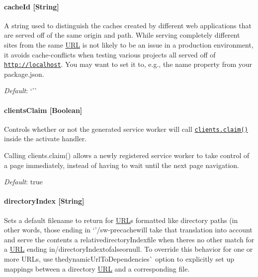 \paragraph*{cache\+Id \mbox{[}String\mbox{]}}

A string used to distinguish the caches created by different web applications that are served off of the same origin and path. While serving completely different sites from the same \mbox{\hyperlink{namespace_u_r_l}{U\+RL}} is not likely to be an issue in a production environment, it avoids cache-\/conflicts when testing various projects all served off of {\ttfamily \href{http://localhost}{\tt http\+://localhost}}. You may want to set it to, e.\+g., the {\ttfamily name} property from your {\ttfamily package.\+json}.

{\itshape Default}\+: `'\textquotesingle{}\`{}

\paragraph*{clients\+Claim \mbox{[}Boolean\mbox{]}}

Controls whether or not the generated service worker will call \href{https://developer.mozilla.org/en-US/docs/Web/API/Clients/claim}{\tt {\ttfamily clients.\+claim()}} inside the {\ttfamily activate} handler.

Calling {\ttfamily clients.\+claim()} allows a newly registered service worker to take control of a page immediately, instead of having to wait until the next page navigation.

{\itshape Default}\+: {\ttfamily true}

\paragraph*{directory\+Index \mbox{[}String\mbox{]}}

Sets a default filename to return for \mbox{\hyperlink{namespace_u_r_l}{U\+RL}}\textquotesingle{}s formatted like directory paths (in other words, those ending in `'/sw-\/precache{\ttfamily will take that translation into account and serve the contents a relative}directory\+Index{\ttfamily file when there\textquotesingle{}s no other match for a \mbox{\hyperlink{namespace_u_r_l}{U\+RL}} ending in}\textquotesingle{}/directory\+Index{\ttfamily to}false{\ttfamily or}null{\ttfamily . To override this behavior for one or more U\+R\+Ls, use the}dynamic\+Url\+To\+Dependencies\`{} option to explicitly set up mappings between a directory \mbox{\hyperlink{namespace_u_r_l}{U\+RL}} and a corresponding file.

